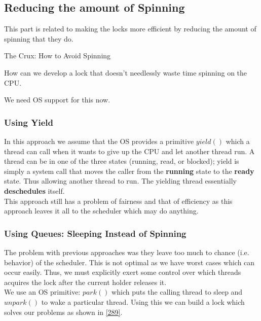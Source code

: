 \subsection{Reducing the amount of Spinning}

This part is related to making the locks more efficient by reducing the amount of
spinning that they do.

\begin{tcolorbox}
    \begin{center}
        The Crux: How to Avoid Spinning
    \end{center}

    How can we develop a lock that doesn't needlessly waste time spinning on the
    CPU.
\end{tcolorbox}

We need OS support for this now.

\subsubsection{Using Yield}

In this approach we assume that the OS provides a primitive $yield()$ which a
thread can call when it wants to give up the CPU and let another thread run.
A thread can be in one of the three states (running, read, or blocked); yield
is simply a system call that moves the caller from the \textbf{running} state
to the \textbf{ready} state. Thus allowing another thread to run. The yielding
thread essentially \textbf{deschedules} itself.\\

This approach still has a problem of fairness and that of efficiency as this 
approach leaves it all to the scheduler which may do anything.

\subsubsection{Using Queues: Sleeping Instead of Spinning}

The problem with previous approaches was they leave too much to chance (i.e.
behavior) of the scheduler. This is not optimal as we have worst cases which
can occur easily. Thus, we must explicitly exert some control over which
threads acquires the lock after the current holder releases it.\\

We use an OS primitive: $park()$ which puts the calling thread to sleep and
$unpark()$ to wake a particular thread. Using this we can build a lock which
solves our problems as shown in \ref{289}.

